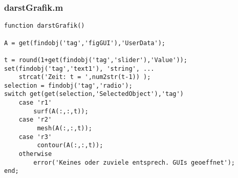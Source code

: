 % 
%
\begin{frame}[fragile]\frametitle{darstGrafik.m}
\begin{lstlisting}
function darstGrafik()

A = get(findobj('tag','figGUI'),'UserData');

t = round(1+get(findobj('tag','slider'),'Value'));
set(findobj('tag','text1'), 'string', ...
    strcat('Zeit: t = ',num2str(t-1)) );
selection = findobj('tag','radio');
switch get(get(selection,'SelectedObject'),'tag')
    case 'r1'
        surf(A(:,:,t));
    case 'r2'
         mesh(A(:,:,t));
    case 'r3'
         contour(A(:,:,t));
    otherwise
        error('Keines oder zuviele entsprech. GUIs geoeffnet');
end;
\end{lstlisting}
\end{frame}
